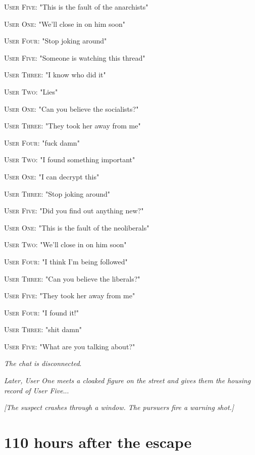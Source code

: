 \documentclass{report}
\begin{document}
\textsc{User Five}: "This is the fault of the anarchists" 

\textsc{User One}: "We'll close in on him soon" 

\textsc{User Four}: "Stop joking around" 

\textsc{User Five}: "Someone is watching this thread" 

\textsc{User Three}: "I know who did it" 

\textsc{User Two}: "Lies" 

\textsc{User One}: "Can you believe the socialists?" 

\textsc{User Three}: "They took her away from me" 

\textsc{User Four}: "fuck damn" 

\textsc{User Two}: "I found something important" 

\textsc{User One}: "I can decrypt this" 

\textsc{User Three}: "Stop joking around" 

\textsc{User Five}: "Did you find out anything new?" 

\textsc{User One}: "This is the fault of the neoliberals" 

\textsc{User Two}: "We'll close in on him soon" 

\textsc{User Four}: "I think I'm being followed" 

\textsc{User Three}: "Can you believe the liberals?" 

\textsc{User Five}: "They took her away from me" 

\textsc{User Four}: "I found it!" 

\textsc{User Three}: "shit damn" 

\textsc{User Five}: "What are you talking about?" 

\textit{The chat is disconnected}. 

\textit{Later, User One meets a cloaked figure on the street and gives them the housing record of User Five}...

\textit{[The suspect crashes through a window. The pursuers fire a warning shot.]}


\section*{110 \small{hours after the escape}}
\end{document}
